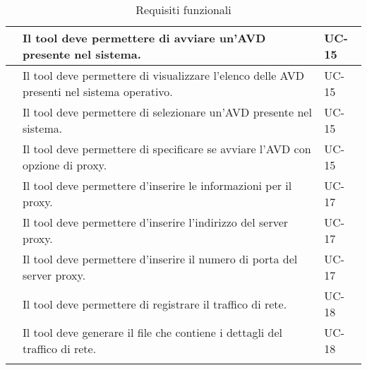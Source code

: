 \begin{longtable}{ | c| C{7cm} |C{3cm} |}
           & Il tool deve permettere di avviare un'AVD presente nel sistema.                                                       & UC-15          \\\hline
        & Il tool deve permettere di visualizzare l'elenco delle AVD presenti nel sistema operativo.                            & UC-15          \\\hline
        & Il tool deve permettere di selezionare un'AVD presente nel sistema.                                                   & UC-15          \\\hline
        & Il tool deve permettere di specificare se avviare l'AVD con opzione di proxy.                                         & UC-15          \\\hline
    \setcounter{subCount}{0}
           & Il tool deve permettere d'inserire le informazioni per il proxy.                                                      & UC-17          \\\hline
        & Il tool deve permettere d'inserire l'indirizzo del server proxy.                                                      & UC-17          \\\hline
        & Il tool deve permettere d'inserire il numero di porta del server proxy.                                               & UC-17          \\\hline
    \setcounter{subCount}{0}
           & Il tool deve permettere di registrare il traffico di rete.                                                            & UC-18          \\\hline
        & Il tool deve generare il file che contiene i dettagli del traffico di rete.                                           & UC-18          \\\hline
    \caption{Requisiti funzionali}
\end{longtable}

\setcounter{rowcount}{0}

